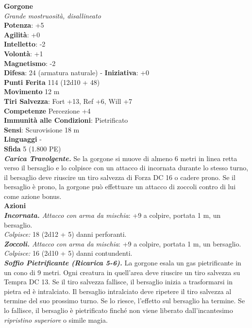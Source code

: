 \begin{multicols}{2}
\medskip\textbf{Gorgone}\\
\emph{Grande mostruosità, disallineato}\\
\textbf{Potenza}: +5\\
\textbf{Agilità}: +0\\
\textbf{Intelletto}: -2\\
\textbf{Volontà}: +1\\
\textbf{Magnetismo}: -2\\
\textbf{Difesa}: 24 (armatura naturale) - \textbf{Iniziativa}: +0\\
\textbf{Punti Ferita} 114 (12d10 + 48)\\
\textbf{Movimento} 12 m\\
\textbf{Tiri Salvezza}: Fort +13, Ref +6, Will +7\\
\textbf{Competenze} Percezione +4\\
\textbf{Immunità alle Condizioni}: Pietrificato\\
\textbf{Sensi}: Scurovisione 18 m\\
\textbf{Linguaggi} -\\
\textbf{Sfida} 5 (1.800 PE)\smallskip\\
\emph{\textbf{Carica Travolgente.}} Se la gorgone si muove di almeno 6 metri in linea retta verso il bersaglio e lo colpisce con un attacco di incornata durante lo stesso turno, il bersaglio deve riuscire un tiro salvezza di Forza DC 16 o cadere prono. Se il bersaglio è prono, la gorgone può effettuare un attacco di zoccoli contro di lui come azione bonus.\\
\smallskip\textbf{Azioni}\\
\emph{\textbf{Incornata.} Attacco con arma da mischia}: +9 a colpire, portata 1 m, un bersaglio.\\
\emph{Colpisce:} 18 (2d12 + 5) danni perforanti.\\
\emph{\textbf{Zoccoli.} Attacco con arma da mischia}: +9 a colpire, portata 1 m, un bersaglio.\\
\emph{Colpisce:} 16 (2d10 + 5) danni contundenti.\\
\emph{\textbf{Soffio Pietrificante (Ricarica 5-6).}} La gorgone esala un gas pietrificante in un cono di 9 metri. Ogni creatura in quell'area deve riuscire un tiro salvezza su Tempra DC 13. Se il tiro salvezza fallisce, il bersaglio inizia a trasformarsi in pietra ed è intralciato. Il bersaglio intralciato deve ripetere il tiro salvezza al termine del suo prossimo turno. Se lo riesce, l'effetto sul bersaglio ha termine. Se lo fallisce, il bersaglio è pietrificato finché non viene liberato dall'incantesimo \emph{ripristino superiore} o simile magia.\\

\end{multicols}
